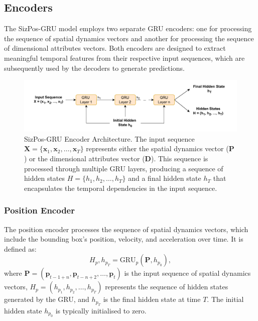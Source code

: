 \documentclass[12pt,oneside]{book} %
\begin{document}
\subsection{Encoders}
The SizPos-GRU model employs two separate GRU encoders: one for processing the
sequence of spatial dynamics vectors and another for processing the sequence of
dimensional attributes vectors. Both encoders are designed to extract
meaningful temporal features from their respective input sequences, which are
subsequently used by the decoders to generate predictions.

\begin{figure}[H]
    \centering
    \includegraphics[width=1\textwidth]{figures/GRUSizPosEncoder.drawio.pdf}
    \caption{SizPos-GRU Encoder Architecture. The input sequence \( \mathbf{X} = \{\mathbf{x}_1, \mathbf{x}_2, \dots, \mathbf{x}_T\} \) represents either the spatial dynamics vector (\(\mathbf{P}\)) or the dimensional attributes vector (\(\mathbf{D}\)). This sequence is processed through multiple GRU layers, producing a sequence of hidden states \( H = \{h_1, h_2, \dots, h_T\} \) and a final hidden state \( h_T \) that encapsulates the temporal dependencies in the input sequence.}
    \label{fig:sizpos-gru-encoder}
\end{figure}

\subsubsection*{Position Encoder}
The position encoder processes the sequence of spatial dynamics vectors, which include the bounding box’s position, velocity, and acceleration over time. It is defined as:
\begin{equation}
    H_p, h_{p_T} = \text{GRU}_p(\mathbf{P}, h_{p_0}),
\end{equation}
where $\mathbf{P} = (\mathbf{p}_{t-1+n}, \mathbf{p}_{t-n+2}, \ldots, \mathbf{p}_t)$ is the input sequence of spatial dynamics vectors, $H_p = (h_{p_1}, h_{p_2}, \ldots, h_{p_T})$ represents the sequence of hidden states generated by the GRU, and $h_{p_T}$ is the final hidden state at time $T$. The initial hidden state $h_{p_0}$ is typically initialised to zero.
\end{document}
